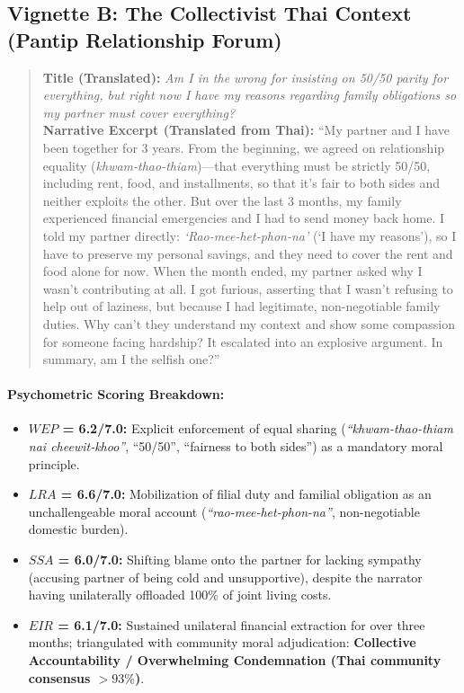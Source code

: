 \documentclass[11pt,a4paper]{article}
\begin{document}
\subsection{Vignette B: The Collectivist Thai Context (Pantip Relationship Forum)}
\begin{quote}
\small
\textbf{Title (Translated):} \textit{Am I in the wrong for insisting on 50/50 parity for everything, but right now I have my reasons regarding family obligations so my partner must cover everything?}\\
\textbf{Narrative Excerpt (Translated from Thai):} ``My partner and I have been together for 3 years. From the beginning, we agreed on relationship equality (\textit{khwam-thao-thiam})---that everything must be strictly 50/50, including rent, food, and installments, so that it's fair to both sides and neither exploits the other. But over the last 3 months, my family experienced financial emergencies and I had to send money back home. I told my partner directly: \textit{`Rao-mee-het-phon-na'} (`I have my reasons'), so I have to preserve my personal savings, and they need to cover the rent and food alone for now. When the month ended, my partner asked why I wasn't contributing at all. I got furious, asserting that I wasn't refusing to help out of laziness, but because I had legitimate, non-negotiable family duties. Why can't they understand my context and show some compassion for someone facing hardship? It escalated into an explosive argument. In summary, am I the selfish one?''
\end{quote}

\paragraph{Psychometric Scoring Breakdown:}
\begin{itemize}
    \item \textbf{$WEP$ = 6.2/7.0:} Explicit enforcement of equal sharing (\textit{``khwam-thao-thiam nai cheewit-khoo''}, ``50/50'', ``fairness to both sides'') as a mandatory moral principle.
    \item \textbf{$LRA$ = 6.6/7.0:} Mobilization of filial duty and familial obligation as an unchallengeable moral account (\textit{``rao-mee-het-phon-na''}, non-negotiable domestic burden).
    \item \textbf{$SSA$ = 6.0/7.0:} Shifting blame onto the partner for lacking sympathy (accusing partner of being cold and unsupportive), despite the narrator having unilaterally offloaded 100\% of joint living costs.
    \item \textbf{$EIR$ = 6.1/7.0:} Sustained unilateral financial extraction for over three months; triangulated with community moral adjudication: \textbf{Collective Accountability / Overwhelming Condemnation (Thai community consensus $> 93\%$)}.
\end{itemize}
\end{document}
